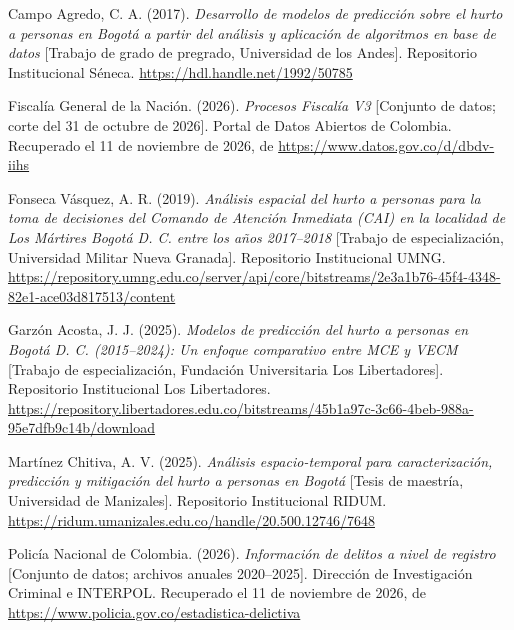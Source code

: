 \documentclass[12pt,letterpaper]{article}
\begin{document}
\clearpage
\begin{thebibliography}{}

Campo Agredo, C. A. (2017). \emph{Desarrollo de modelos de predicción sobre el hurto a personas en Bogotá a partir del análisis y aplicación de algoritmos en base de datos} [Trabajo de grado de pregrado, Universidad de los Andes]. Repositorio Institucional Séneca. \url{https://hdl.handle.net/1992/50785}

Fiscalía General de la Nación. (2026). \emph{Procesos Fiscalía V3} [Conjunto de datos; corte del 31 de octubre de 2026]. Portal de Datos Abiertos de Colombia. Recuperado el 11 de noviembre de 2026, de \url{https://www.datos.gov.co/d/dbdv-iihs}

Fonseca Vásquez, A. R. (2019). \emph{Análisis espacial del hurto a personas para la toma de decisiones del Comando de Atención Inmediata (CAI) en la localidad de Los Mártires Bogotá D. C. entre los años 2017--2018} [Trabajo de especialización, Universidad Militar Nueva Granada]. Repositorio Institucional UMNG. \url{https://repository.umng.edu.co/server/api/core/bitstreams/2e3a1b76-45f4-4348-82e1-ace03d817513/content}

Garzón Acosta, J. J. (2025). \emph{Modelos de predicción del hurto a personas en Bogotá D. C. (2015--2024): Un enfoque comparativo entre MCE y VECM} [Trabajo de especialización, Fundación Universitaria Los Libertadores]. Repositorio Institucional Los Libertadores. \url{https://repository.libertadores.edu.co/bitstreams/45b1a97c-3c66-4beb-988a-95e7dfb9c14b/download}

Martínez Chitiva, A. V. (2025). \emph{Análisis espacio-temporal para caracterización, predicción y mitigación del hurto a personas en Bogotá} [Tesis de maestría, Universidad de Manizales]. Repositorio Institucional RIDUM. \url{https://ridum.umanizales.edu.co/handle/20.500.12746/7648}

Policía Nacional de Colombia. (2026). \emph{Información de delitos a nivel de registro} [Conjunto de datos; archivos anuales 2020--2025]. Dirección de Investigación Criminal e INTERPOL. Recuperado el 11 de noviembre de 2026, de \url{https://www.policia.gov.co/estadistica-delictiva}


\end{thebibliography}
\end{document}
